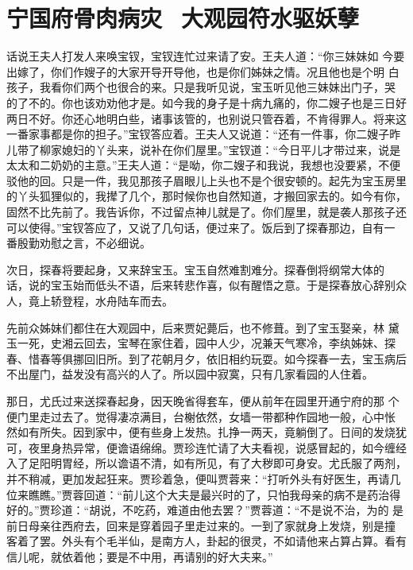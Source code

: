 \chapter{宁国府骨肉病灾~大观园符水驱妖孽}

话说王夫人打发人来唤宝钗，宝钗连忙过来请了安。王夫人道：“你三妹妹如
今要出嫁了，你们作嫂子的大家开导开导他，也是你们姊妹之情。况且他也是个明
白孩子，我看你们两个也很合的来。只是我听见说，宝玉听见他三妹妹出门子，哭
的了不的。你也该劝劝他才是。如今我的身子是十病九痛的，你二嫂子也是三日好
两日不好。你还心地明白些，诸事该管的，也别说只管吞着，不肯得罪人。将来这
一番家事都是你的担子。”宝钗答应着。王夫人又说道：“还有一件事，你二嫂子昨
儿带了柳家媳妇的丫头来，说补在你们屋里。”宝钗道：“今日平儿才带过来，说是
太太和二奶奶的主意。”王夫人道：“是呦，你二嫂子和我说，我想也没要紧，不便
驳他的回。只是一件，我见那孩子眉眼儿上头也不是个很安顿的。起先为宝玉房里
的丫头狐狸似的，我撵了几个，那时候你也自然知道，才搬回家去的。如今有你，
固然不比先前了。我告诉你，不过留点神儿就是了。你们屋里，就是袭人那孩子还
可以使得。”宝钗答应了，又说了几句话，便过来了。饭后到了探春那边，自有一
番殷勤劝慰之言，不必细说。

次日，探春将要起身，又来辞宝玉。宝玉自然难割难分。探春倒将纲常大体的
话，说的宝玉始而低头不语，后来转悲作喜，似有醒悟之意。于是探春放心辞别众
人，竟上轿登程，水舟陆车而去。

先前众姊妹们都住在大观园中，后来贾妃薨后，也不修葺。到了宝玉娶亲，林
黛玉一死，史湘云回去，宝琴在家住着，园中人少，况兼天气寒冷，李纨姊妹、探
春、惜春等俱挪回旧所。到了花朝月夕，依旧相约玩耍。如今探春一去，宝玉病后
不出屋门，益发没有高兴的人了。所以园中寂寞，只有几家看园的人住着。

那日，尤氏过来送探春起身，因天晚省得套车，便从前年在园里开通宁府的那
个便门里走过去了。觉得凄凉满目，台榭依然，女墙一带都种作园地一般，心中怅
然如有所失。因到家中，便有些身上发热。扎挣一两天，竟躺倒了。日间的发烧犹
可，夜里身热异常，便谵语绵绵。贾珍连忙请了大夫看视，说感冒起的，如今缠经
入了足阳明胃经，所以谵语不清，如有所见，有了大秽即可身安。尤氏服了两剂，
并不稍减，更加发起狂来。贾珍着急，便叫贾蓉来：“打听外头有好医生，再请几
位来瞧瞧。”贾蓉回道：“前儿这个大夫是最兴时的了，只怕我母亲的病不是药治得
好的。”贾珍道：“胡说，不吃药，难道由他去罢？”贾蓉道：“不是说不治，为的
是前日母亲往西府去，回来是穿着园子里走过来的。一到了家就身上发烧，别是撞
客着了罢。外头有个毛半仙，是南方人，卦起的很灵，不如请他来占算占算。看有
信儿呢，就依着他；要是不中用，再请别的好大夫来。”

